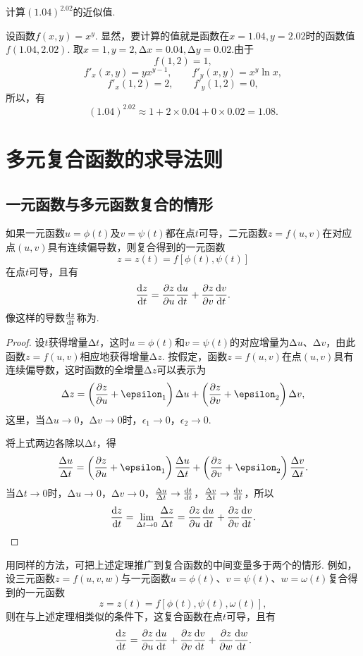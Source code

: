 \begin{example}
计算\((1.04)^{2.02}\)的近似值.
\begin{solution}
设函数\(f(x,y) = x^y\).
显然，要计算的值就是函数在\(x=1.04,y=2.02\)时的函数值\(f(1.04,2.02)\).
取\(x=1,y=2,\increment x=0.04,\increment y=0.02\).由于\[
f(1,2)=1,
\]\[
f'_x(x,y) = y x^{y-1}, \qquad f'_y(x,y) = x^y \ln x,
\]\[
f'_x(1,2) = 2, \qquad f'_y(1,2) = 0,
\]所以，有\[
(1.04)^{2.02} \approx 1 + 2 \times 0.04 + 0 \times 0.02 = 1.08.
\]
\end{solution}
\end{example}

\section{多元复合函数的求导法则}
\subsection{一元函数与多元函数复合的情形}
\begin{theorem}
如果一元函数\(u=\phi(t)\)及\(v=\psi(t)\)都在点\(t\)可导，二元函数\(z=f(u,v)\)在对应点\((u,v)\)具有连续偏导数，则复合得到的一元函数\[
z = z(t) = f[\phi(t),\psi(t)]
\]在点\(t\)可导，且有\[
\dv{z}{t} = \pdv{z}{u}\dv{u}{t} + \pdv{z}{v}\dv{v}{t}.
\]
像这样的导数\(\dv{z}{t}\)称为.
\begin{proof}
\def\D#1#2{\frac{\increment #1}{\increment #2}}
设\(t\)获得增量\(\increment t\)，这时\(u=\phi(t)\)和\(v=\psi(t)\)的对应增量为\(\increment u\)、\(\increment v\)，由此函数\(z=f(u,v)\)相应地获得增量\(\increment z\).
按假定，函数\(z=f(u,v)\)在点\((u,v)\)具有连续偏导数，这时函数的全增量\(\increment z\)可以表示为
\[
\increment z = \left(\pdv{z}{u} + \epsilon_1\right) \increment u + \left(\pdv{z}{v} + \epsilon_2\right) \increment v,
\]这里，当\(\increment u\to0\)，\(\increment v\to0\)时，\(\epsilon_1\to0\)，\(\epsilon_2\to0\).

将上式两边各除以\(\increment t\)，得\[
\D{u}{t} = \left(\pdv{z}{u} + \epsilon_1\right) \D{u}{t} + \left(\pdv{z}{v} + \epsilon_2\right) \D{v}{t}.
\]当\(\increment t\to0\)时，\(\increment u\to0\)，\(\increment v\to0\)，\(\D{u}{t} \to \dv{t}{t}\)，\(\D{v}{t} \to \dv{v}{t}\)，所以\[
\dv{z}{t} = \lim_{\increment t\to0}{\D{z}{t}}
= \pdv{z}{u} \dv{u}{t} + \pdv{z}{v} \dv{v}{t}.
\qedhere
\]
\end{proof}
\end{theorem}
用同样的方法，可把上述定理推广到复合函数的中间变量多于两个的情形.
例如，设三元函数\(z=f(u,v,w)\)与一元函数\(u=\phi(t)\)、\(v=\psi(t)\)、\(w=\omega(t)\)复合得到的一元函数\[
z = z(t) = f[\phi(t),\psi(t),\omega(t)],
\]则在与上述定理相类似的条件下，这复合函数在点\(t\)可导，且有\[
\dv{z}{t} = \pdv{z}{u}\dv{u}{t} + \pdv{z}{v}\dv{v}{t} + \pdv{z}{w}\dv{w}{t}.
\]

